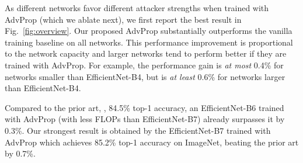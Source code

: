\documentclass[10pt,twocolumn,letterpaper]{article}
\begin{document}
As different networks favor different attacker strengths when trained with AdvProp (which we ablate next), we first report the best result in Fig.~\ref{fig:overview}.  Our proposed AdvProp substantially outperforms the vanilla training baseline on all networks. This performance improvement is proportional to the network capacity and larger networks tend to perform better if they are trained with AdvProp. For example, the performance gain is \emph{at most} 0.4\% for networks smaller than EfficientNet-B4, but is \emph{at least} 0.6\% for networks larger than EfficientNet-B4.


Compared to the prior art, \ie, 84.5\% top-1 accuracy, an EfficientNet-B6 trained with AdvProp (with  less FLOPs than EfficientNet-B7) already surpasses it by 0.3\%. Our strongest result is obtained by the EfficientNet-B7 trained with AdvProp which achieves 85.2\% top-1 accuracy on ImageNet, beating the prior art by 0.7\%.
\end{document}
